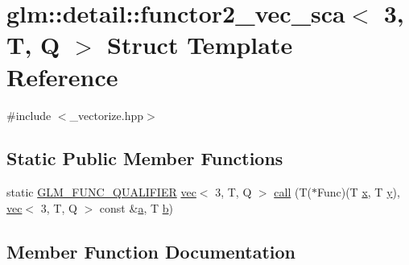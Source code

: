 \hypertarget{structglm_1_1detail_1_1functor2__vec__sca_3_013_00_01_t_00_01_q_01_4}{}\section{glm\+:\+:detail\+:\+:functor2\+\_\+vec\+\_\+sca$<$ 3, T, Q $>$ Struct Template Reference}
\label{structglm_1_1detail_1_1functor2__vec__sca_3_013_00_01_t_00_01_q_01_4}


{\ttfamily \#include $<$\+\_\+vectorize.\+hpp$>$}

\subsection*{Static Public Member Functions}
\begin{DoxyCompactItemize}
\item 
static \hyperlink{setup_8hpp_a33fdea6f91c5f834105f7415e2a64407}{G\+L\+M\+\_\+\+F\+U\+N\+C\+\_\+\+Q\+U\+A\+L\+I\+F\+I\+ER} \hyperlink{structglm_1_1vec}{vec}$<$ 3, T, Q $>$ \hyperlink{structglm_1_1detail_1_1functor2__vec__sca_3_013_00_01_t_00_01_q_01_4_ac197b76d56eec6695892213bbb6bfab9}{call} (T($\ast$Func)(T \hyperlink{_s_d_l__opengl_8h_ad0e63d0edcdbd3d79554076bf309fd47}{x}, T \hyperlink{_s_d_l__opengl_8h_a1675d9d7bb68e1657ff028643b4037e3}{y}), \hyperlink{structglm_1_1vec}{vec}$<$ 3, T, Q $>$ const \&\hyperlink{_s_d_l__opengl__glext_8h_a3309789fc188587d666cda5ece79cf82}{a}, T \hyperlink{_s_d_l__opengl__glext_8h_a0f71581a41fd2264c8944126dabbd010}{b})
\end{DoxyCompactItemize}


\subsection{Member Function Documentation}
\mbox{\label{structglm_1_1detail_1_1functor2__vec__sca_3_013_00_01_t_00_01_q_01_4_ac197b76d56eec6695892213bbb6bfab9}} 
